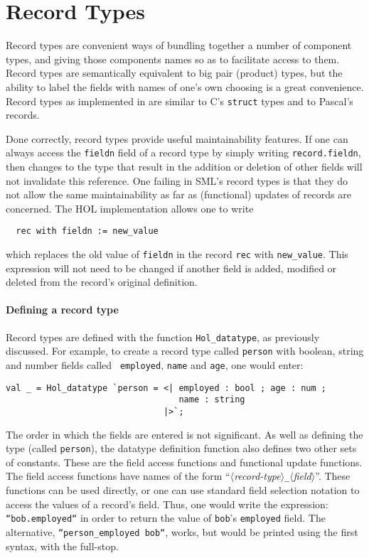 \section{Record Types}

Record types are convenient ways of bundling together a number of
component types, and giving those components names so as to facilitate
access to them.  Record types are semantically equivalent to big pair
(product) types, but the ability to label the fields with names of
one's own choosing is a great convenience.  Record types as
implemented in \HOL{} are similar to C's \texttt{struct} types and to
Pascal's records.

Done correctly, record types provide useful maintainability features.
If one can always access the {\tt fieldn} field of a record type by
simply writing {\tt record.fieldn}, then changes to the type that
result in the addition or deletion of other fields will not invalidate
this reference.  One failing in SML's record types is that they do not
allow the same maintainability as far as (functional) updates of
records are concerned.  The HOL implementation allows one to write
\begin{verbatim}
  rec with fieldn := new_value
\end{verbatim}
which replaces the old value of {\tt fieldn} in the record {\tt rec}
with {\tt new\_value}.  This expression will not need to be changed if
another field is added, modified or deleted from the record's original
definition.

\paragraph{Defining a record type}
Record types are defined with the function \texttt{Hol\_datatype}, as
previously discussed.  For example, to create a record type called
{\tt person} with boolean, string and number fields called {\tt
  employed}, {\tt name} and {\tt age}, one would enter:
\begin{verbatim}
val _ = Hol_datatype `person = <| employed : bool ; age : num ;
                                  name : string
                               |>`;
\end{verbatim}
The order in which the fields are entered is not significant. As well
as defining the type (called {\tt person}), the datatype definition
function also defines two other sets of constants.  These are the
field access functions and functional update functions.  The field
access functions have names of the form
``$\langle$\textsl{record-type\/}$\rangle$\verb|_|$\langle$\textsl{field\/}$\rangle$''.
These functions can be used directly, or one can use standard field
selection notation to access the values of a record's field.  Thus,
one would write the expression: \mbox{\tt ``bob.employed``} in order
to return the value of {\tt bob}'s {\tt employed} field.  The
alternative, \texttt{``person\_employed bob``}, works, but would be
printed using the first syntax, with the full-stop.

